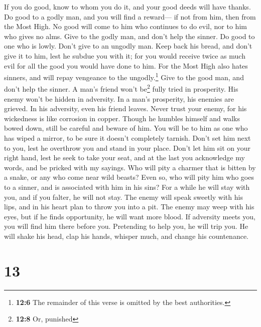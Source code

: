  If you do good, know to whom you do it, and your good
deeds will have thanks.  Do good to a godly man, and you
will find a reward--- if not from him, then from the Most High.
 No good will come to him who continues to do evil, nor to
him who gives no alms.  Give to the godly man, and don't
help the sinner.  Do good to one who is lowly. Don't give
to an ungodly man. Keep back his bread, and don't give it to him, lest
he subdue you with it; for you would receive twice as much evil for all
the good you would have done to him.  For the Most High
also hates sinners, and will repay vengeance to the ungodly.\footnote{\textbf{12:6}
  The remainder of this verse is omitted by the best authorities.}
 Give to the good man, and don't help the sinner.
 A man's friend won't be\footnote{\textbf{12:8} Or,
  punished} fully tried in prosperity. His enemy won't be hidden in
adversity.  In a man's prosperity, his enemies are
grieved. In his adversity, even his friend leaves.  Never
trust your enemy, for his wickedness is like corrosion in copper.
 Though he humbles himself and walks bowed down, still be
careful and beware of him. You will be to him as one who has wiped a
mirror, to be sure it doesn't completely tarnish.  Don't
set him next to you, lest he overthrow you and stand in your place.
Don't let him sit on your right hand, lest he seek to take your seat,
and at the last you acknowledge my words, and be pricked with my
sayings.  Who will pity a charmer that is bitten by a
snake, or any who come near wild beasts?  Even so, who
will pity him who goes to a sinner, and is associated with him in his
sins?  For a while he will stay with you, and if you
falter, he will not stay.  The enemy will speak sweetly
with his lips, and in his heart plan to throw you into a pit. The enemy
may weep with his eyes, but if he finds opportunity, he will want more
blood.  If adversity meets you, you will find him there
before you. Pretending to help you, he will trip you.  He
will shake his head, clap his hands, whisper much, and change his
countenance.

\hypertarget{section-10}{%
\section{13}\label{section-10}}

